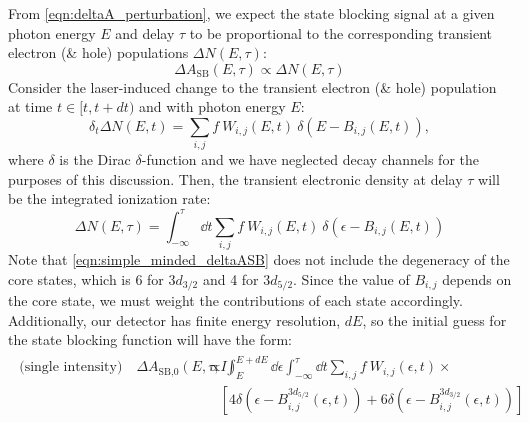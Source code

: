 From \cref{eqn:deltaA_perturbation}, we expect the state blocking signal at a given photon energy $E$ and delay $\tau$ to be proportional to the corresponding transient electron (\& hole) populations $\Delta N(E, \tau)$:
\begin{equation}
\label{eqn:simple_minded_deltaASB}
\Delta A_{\textrm{SB}}(E,\tau) \propto \Delta N(E, \tau)
\end{equation}
Consider the laser-induced change to the transient electron (\& hole) population at time $t \in [t, t+dt)$ and with photon energy $E$:
\begin{equation}
\delta_t \Delta N(E, t) = \sum_{i,j} f \ W_{i,j}(E, t) \ \delta(E-B_{i,j}(E, t)),
\end{equation}
where $\delta$ is the Dirac $\delta$-function and we have neglected decay channels for the purposes of this discussion. Then, the transient electronic density at delay $\tau$ will be the integrated ionization rate:
\begin{equation}
\Delta N(E, \tau) = \int_{-\infty}^{\tau} \dd{t} \sum_{i,j} f \ W_{i,j}(E, t) \ \delta(\epsilon-B_{i,j}(E, t))
\end{equation}
Note that \cref{eqn:simple_minded_deltaASB} does not include the degeneracy of the core states, which is 6 for $3d_{3/2}$ and 4 for $3d_{5/2}$. Since the value of $B_{i,j}$ depends on the core state, we must weight the contributions of each state accordingly. Additionally, our detector has finite energy resolution, $dE$, so the initial guess for the state blocking function will have the form:
\begin{align}
\label{eqn:nonlinear_deltaASB0}
\begin{split}
\textrm{(single intensity)} \quad \Delta A_{\textrm{SB,0}}(E,\tau; I) &\propto \int_{E}^{E+dE} \dd{\epsilon} \int_{-\infty}^{\tau} \dd{t} \sum_{i,j} f \ W_{i,j}(\epsilon, t) \times \\
& \quad \left[ 4 \delta(\epsilon-B_{i,j}^{3d_{5/2}}(\epsilon, t)) + 6 \delta(\epsilon-B_{i,j}^{3d_{3/2}}(\epsilon, t)) \right]
\end{split}
\end{align}

